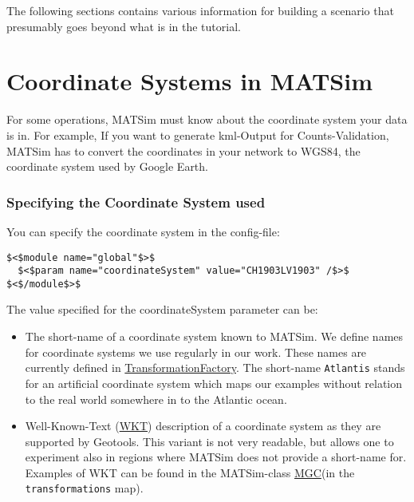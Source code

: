 The following sections contains various information for building a scenario that presumably goes beyond what is in the tutorial.

\vfill\eject
\section{Coordinate Systems in MATSim}

For  some operations, MATSim must know about the coordinate system your data  is in. For example, If you want to generate kml-Output for  Counts-Validation, MATSim has to convert the coordinates in your network  to WGS84, the coordinate system used by Google Earth.


\subsubsection{Specifying the Coordinate System used}

You can specify the coordinate system in the config-file:
\begin{verbatim}
$<$module name="global"$>$
  $<$param name="coordinateSystem" value="CH1903LV1903" /$>$
$<$/module$>$
\end{verbatim}

The value specified for the coordinateSystem parameter can be:
\begin{itemize}
	\item The short-name of a coordinate system known to MATSim. We define  names for coordinate systems we use regularly in our work. These names  are currently defined in \href{http://matsim.svn.sourceforge.net/viewvc/matsim/matsim/trunk/src/main/java/org/matsim/core/utils/geometry/transformations/TransformationFactory.java?view=markup}{TransformationFactory}. The short-name 
\texttt{Atlantis}  stands for an artificial coordinate system which maps our examples  without relation to the real world somewhere in to the Atlantic ocean.
	\item Well-Known-Text (\href{http://www.geoapi.org/snapshot/javadoc/org/opengis/referencing/doc-files/WKT.html}{WKT})  description of a coordinate system as they are supported by Geotools.  This variant is not very readable, but allows one to experiment also in  regions where MATSim does not provide a short-name for. Examples of WKT  can be found in the MATSim-class \href{http://matsim.svn.sourceforge.net/viewvc/matsim/matsim/trunk/src/main/java/org/matsim/core/utils/geometry/geotools/MGC.java?view=markup}{MGC}(in the 
\texttt{transformations} map).
\end{itemize}

